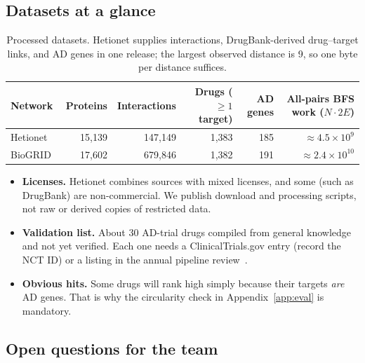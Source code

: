 \subsection{Datasets at a glance}
\label{sec:datasets}

\begin{table}[!ht]
\centering
\small
\begin{tabularx}{\linewidth}{@{}lrrrrr@{}}
\toprule
Network & Proteins & Interactions & Drugs (${\ge}1$ target) & AD genes & All-pairs BFS work ($N\cdot 2E$) \\
\midrule
Hetionet~\cite{himmelstein2017hetionet} & 15{,}139 & 147{,}149 & 1{,}383 & 185 & $\approx 4.5\times10^{9}$ \\
BioGRID~\cite{oughtred2021biogrid} & 17{,}602 & 679{,}846 & 1{,}382 & 191 & $\approx 2.4\times10^{10}$ \\
\bottomrule
\end{tabularx}
\caption{Processed datasets. Hetionet supplies interactions, DrugBank-derived
drug--target links, and AD genes in one release; the largest observed distance
is 9, so one byte per distance suffices.}
\end{table}

\begin{itemize}[nosep]
  \item \textbf{Licenses.} Hetionet combines sources with mixed licenses, and
        some (such as DrugBank) are non-commercial. We publish download and
        processing scripts, not raw or derived copies of restricted data.
  \item \textbf{Validation list.} About 30 AD-trial drugs compiled from
        general knowledge and not yet verified. Each one needs a
        ClinicalTrials.gov entry (record the NCT ID) or a listing in the annual
        pipeline review~\cite{cummings2024pipeline}.
  \item \textbf{Obvious hits.} Some drugs will rank high simply because their
        targets \emph{are} AD genes. That is why the circularity check in
        Appendix~\ref{app:eval} is mandatory.
\end{itemize}

\subsection{Open questions for the team}

